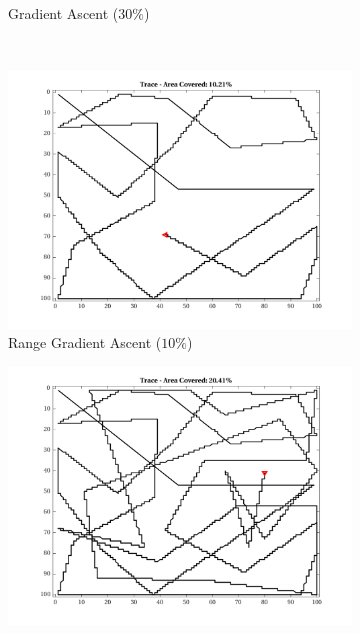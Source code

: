 \begin{figure}[htb!]
\begin{subfigure}[t]{0.32\textwidth}
        \ssp
        \captionsetup{skip=0.20\baselineskip,size=footnotesize}
        \caption{Gradient Ascent ($30\%$)}
    \end{subfigure}%
    \\
    \begin{subfigure}[t]{0.32\textwidth}
        \centering
        \includegraphics[width=\linewidth]{figures/hbresults/path_gr_10p_100x100_sf_100_seed_2.png}
        \ssp
        \captionsetup{skip=0.20\baselineskip,size=footnotesize}
        \caption{Range Gradient Ascent ($10\%$)}
    \end{subfigure}%
    \begin{subfigure}[t]{0.32\textwidth}
        \centering
        \includegraphics[width=\linewidth]{figures/hbresults/path_gr_20p_100x100_sf_100_seed_2.png}

\end{subfigure}
\end{figure}
